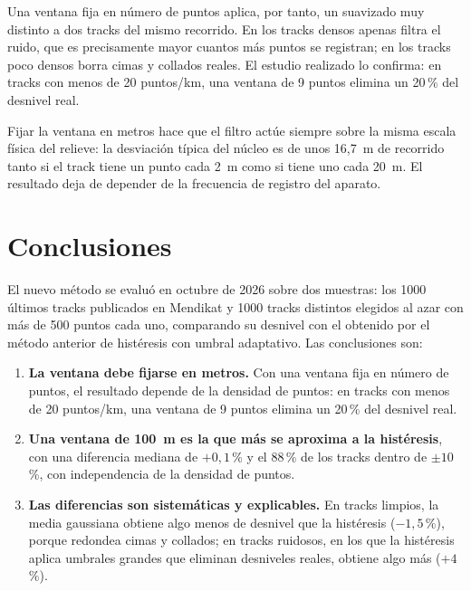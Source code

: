 \documentclass[11pt,a4paper]{article}
\begin{document}
Una ventana fija en número de puntos aplica, por tanto, un suavizado muy
distinto a dos tracks del mismo recorrido. En los tracks densos apenas filtra
el ruido, que es precisamente mayor cuantos más puntos se registran; en los
tracks poco densos borra cimas y collados reales. El estudio realizado lo
confirma: en tracks con menos de 20 puntos/km, una ventana de 9 puntos elimina
un 20\,\% del desnivel real.

Fijar la ventana en metros hace que el filtro actúe siempre sobre la misma
escala física del relieve: la desviación típica del núcleo es de unos 16,7~m
de recorrido tanto si el track tiene un punto cada 2~m como si tiene uno cada
20~m. El resultado deja de depender de la frecuencia de registro del aparato.

\section{Conclusiones}
\label{sec:conclusiones}

El nuevo método se evaluó en octubre de 2026 sobre dos muestras: los 1000
últimos tracks publicados en Mendikat y 1000 tracks distintos elegidos al azar
con más de 500 puntos cada uno, comparando su desnivel con el obtenido por el
método anterior de histéresis con umbral adaptativo. Las conclusiones son:

\begin{enumerate}
    \item \textbf{La ventana debe fijarse en metros.} Con una ventana fija en
          número de puntos, el resultado depende de la densidad de puntos: en
          tracks con menos de 20 puntos/km, una ventana de 9 puntos elimina un
          20\,\% del desnivel real.
    \item \textbf{Una ventana de 100~m es la que más se aproxima a la
          histéresis}, con una diferencia mediana de $+0{,}1$\,\% y el
          88\,\% de los tracks dentro de $\pm 10$\,\%, con independencia de la
          densidad de puntos.
    \item \textbf{Las diferencias son sistemáticas y explicables.} En tracks
          limpios, la media gaussiana obtiene algo menos de desnivel que la
          histéresis ($-1{,}5$\,\%), porque redondea cimas y collados; en
          tracks ruidosos, en los que la histéresis aplica umbrales grandes que
          eliminan desniveles reales, obtiene algo más ($+4$\,\%).
\end{enumerate}
\end{document}

